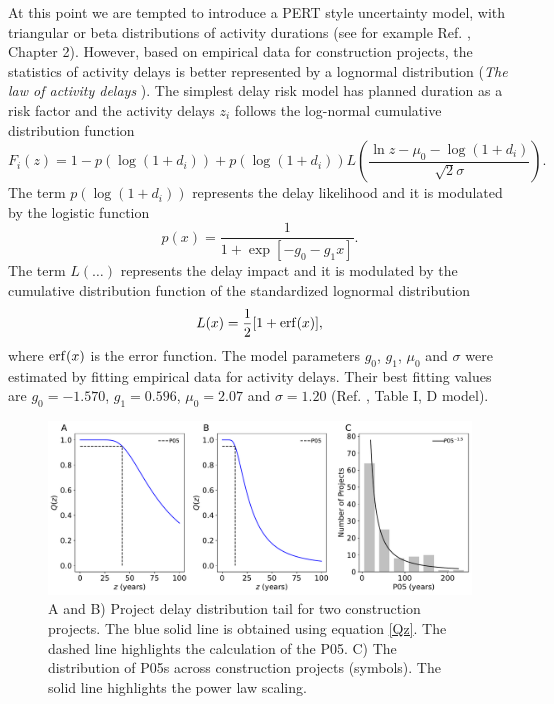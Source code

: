 \documentclass[11pt]{article}
\begin{document}
At this point we are tempted to introduce a PERT style uncertainty model, with triangular or beta distributions of activity durations (see for example Ref. \cite{hulett16}, Chapter 2). However, based on empirical data for construction projects, the statistics of activity delays is better represented  by a lognormal distribution ({\em The law of activity delays} \cite{vazquez23}). The simplest delay risk model has planned duration as a risk factor and the activity delays $z_i$ follows the log-normal cumulative distribution function \cite{vazquez23law}
%
\begin{equation}
F_i(z) = 1-p(\log(1+d_i)) + p(\log(1+d_i)) L\left(   \frac{\ln z - \mu_0 - \log(1+d_i )  }{ \sqrt{2}\sigma} \right).
\label{Fi}
\end{equation}
%
The term $p(\log(1+d_i))$ represents the delay likelihood and it is modulated by the logistic function
%
\begin{equation}
p(x) = \frac{1}{1+\exp[-g_0-g_1x]}.
\label{delay_likelihood}
\end{equation}
%
The term $L(\ldots)$ represents the delay impact and it is modulated by the cumulative distribution function of the standardized lognormal distribution 
%
\begin{equation}
L(x) = \frac{1}{2}[1 + {\rm erf}(x)],
\label{CDFlognormal}
\end{equation}
%
where ${\rm erf}(x)$ is the error function. The model parameters $g_0$, $g_1$, $\mu_0$ and $\sigma$ were estimated by fitting empirical data for activity delays. Their best fitting values are $g_0=-1.570$, $g_1=0.596$, $\mu_0=2.07$ and $\sigma=1.20$ (Ref. \cite{vazquez23law}, Table I, D model).

\begin{figure}[t]
\begin{center}
\includegraphics[width=6.3in]{fig_Qz_D}
\end{center}
\caption{A and B) Project delay distribution tail for two construction projects. The blue solid line is obtained using equation \ref{Qz}. The dashed line highlights the calculation of the P05. C) The distribution of P05s across construction projects (symbols). The solid line highlights the power law scaling.}
\label{fig_Qz_D}
\end{figure}
\end{document}
